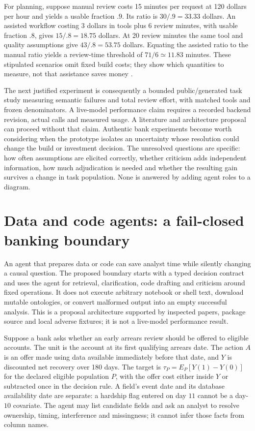 For planning, suppose manual review costs 15 minutes per request at 120 dollars
per hour and yields a usable fraction $.9$. Its ratio is $30/.9=33.33$ dollars.
An assisted workflow costing 3 dollars in tools plus 6 review minutes, with
usable fraction $.8$, gives $15/.8=18.75$ dollars. At 20 review minutes the
same tool and quality assumptions give $43/.8=53.75$ dollars. Equating the
assisted ratio to the manual ratio yields a review-time threshold of
$71/6\simeq11.83$ minutes. These stipulated scenarios omit fixed build costs;
they show which quantities to measure, not that assistance saves money
\cite{exec13_architecture_exact}.

The next justified experiment is consequently a bounded public/generated task
study measuring semantic failures and total review effort, with matched tools
and frozen denominators. A live-model performance claim requires a recorded
backend revision, actual calls and measured usage. A literature and architecture
proposal can proceed without that claim. Authentic bank experiments become
worth considering when the prototype isolates an uncertainty whose resolution
could change the build or investment decision. The unresolved questions are
specific: how often assumptions are elicited correctly, whether criticism adds
independent information, how much adjudication is needed and whether the
resulting gain survives a change in task population. None is answered by adding
agent roles to a diagram.
\label{exec13:agent-architecture-end}


\section{Data and code agents: a fail-closed banking boundary}
\label{exec13:data-code-agents}

An agent that prepares data or code can save analyst time while silently changing a causal question. The proposed boundary starts with a typed decision contract and uses the agent for retrieval, clarification, code drafting and criticism around fixed operations. It does not execute arbitrary notebook or shell text, download mutable ontologies, or convert malformed output into an empty successful analysis. This is a proposal architecture supported by inspected papers, package source and local adverse fixtures; it is not a live-model performance result.

Suppose a bank asks whether an early arrears review should be offered to eligible accounts. The unit is the account at its first qualifying arrears date. The action $A$ is an offer made using data available immediately before that date, and $Y$ is discounted net recovery over 180 days. The target is $\tau_P=E_P[Y(1)-Y(0)]$ for the declared eligible population $P$, with the offer cost either inside $Y$ or subtracted once in the decision rule. A field's event date and its database availability date are separate: a hardship flag entered on day $11$ cannot be a day-$10$ covariate. The agent may list candidate fields and ask an analyst to resolve ownership, timing, interference and missingness; it cannot infer those facts from column names.

